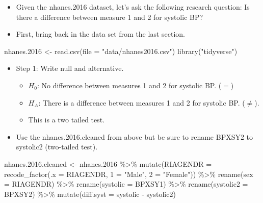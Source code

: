 \documentclass[
  letterpaper,
  DIV=11,
  numbers=noendperiod]{scrreprt}
\newenvironment{Shaded}{\begin{snugshade}}{\end{snugshade}}
\newcommand{\AttributeTok}[1]{\textcolor[rgb]{0.40,0.45,0.13}{#1}}
\newcommand{\FloatTok}[1]{\textcolor[rgb]{0.68,0.00,0.00}{#1}}
\newcommand{\FunctionTok}[1]{\textcolor[rgb]{0.28,0.35,0.67}{#1}}
\newcommand{\NormalTok}[1]{\textcolor[rgb]{0.00,0.23,0.31}{#1}}
\newcommand{\OtherTok}[1]{\textcolor[rgb]{0.00,0.23,0.31}{#1}}
\newcommand{\SpecialCharTok}[1]{\textcolor[rgb]{0.37,0.37,0.37}{#1}}
\newcommand{\StringTok}[1]{\textcolor[rgb]{0.13,0.47,0.30}{#1}}
\providecommand{\tightlist}{%
  \setlength{\itemsep}{0pt}\setlength{\parskip}{0pt}}\usepackage{longtable,booktabs,array}
\begin{document}
\begin{itemize}
\item
  Given the nhanes.2016 dataset, let's ask the following research
  question: Is there a difference between measure 1 and 2 for systolic
  BP?
\item
  First, bring back in the data set from the last section.
\end{itemize}

\begin{Shaded}
\begin{Highlighting}[]
\NormalTok{nhanes}\FloatTok{.2016} \OtherTok{\textless{}{-}} \FunctionTok{read.csv}\NormalTok{(}\AttributeTok{file =} \StringTok{"data/nhanes2016.csv"}\NormalTok{)}
\FunctionTok{library}\NormalTok{(}\StringTok{"tidyverse"}\NormalTok{)}
\end{Highlighting}
\end{Shaded}

\begin{itemize}
\tightlist
\item
  Step 1: Write null and alternative.

  \begin{itemize}
  \tightlist
  \item
    \(H_0\): No difference between measures 1 and 2 for systolic BP.
    (\(=\))
  \item
    \(H_A\): There is a difference between measures 1 and 2 for systolic
    BP. (\(\neq\)).
  \item
    This is a two tailed test.
  \end{itemize}
\item
  Use the nhanes.2016.cleaned from above but be sure to rename BPXSY2 to
  systolic2 (two-tailed test).
\end{itemize}

\begin{Shaded}
\begin{Highlighting}[]
\NormalTok{nhanes.}\FloatTok{2016.}\NormalTok{cleaned }\OtherTok{\textless{}{-}}\NormalTok{ nhanes}\FloatTok{.2016} \SpecialCharTok{\%\textgreater{}\%}
    \FunctionTok{mutate}\NormalTok{(}\AttributeTok{RIAGENDR =} \FunctionTok{recode\_factor}\NormalTok{(}\AttributeTok{.x =}\NormalTok{ RIAGENDR, }\StringTok{\textasciigrave{}}\AttributeTok{1}\StringTok{\textasciigrave{}} \OtherTok{=} \StringTok{"Male"}\NormalTok{, }\StringTok{\textasciigrave{}}\AttributeTok{2}\StringTok{\textasciigrave{}} \OtherTok{=} \StringTok{"Female"}\NormalTok{)) }\SpecialCharTok{\%\textgreater{}\%}
    \FunctionTok{rename}\NormalTok{(}\AttributeTok{sex =}\NormalTok{ RIAGENDR) }\SpecialCharTok{\%\textgreater{}\%}
    \FunctionTok{rename}\NormalTok{(}\AttributeTok{systolic =}\NormalTok{ BPXSY1) }\SpecialCharTok{\%\textgreater{}\%}
    \FunctionTok{rename}\NormalTok{(}\AttributeTok{systolic2 =}\NormalTok{ BPXSY2) }\SpecialCharTok{\%\textgreater{}\%}
    \FunctionTok{mutate}\NormalTok{(}\AttributeTok{diff.syst =}\NormalTok{ systolic }\SpecialCharTok{{-}}\NormalTok{ systolic2)}
\end{Highlighting}
\end{Shaded}
\end{document}
